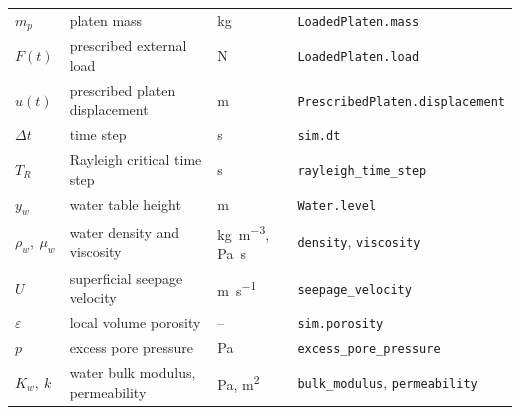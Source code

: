 \begin{table}[htbp]
\begin{tabular}{llll}
    $m_{p}$          & platen mass                      & \unit{\kilogram}     & \texttt{LoadedPlaten.mass} \\
    $F(t)$           & prescribed external load         & \unit{\newton}       & \texttt{LoadedPlaten.load} \\
    $u(t)$           & prescribed platen displacement   & \unit{\metre}        & \texttt{PrescribedPlaten.displacement} \\
    $\Delta t$       & time step                        & \unit{\second}       & \texttt{sim.dt} \\
    $T_{R}$          & Rayleigh critical time step      & \unit{\second}       & \texttt{rayleigh\_time\_step} \\
    $y_{w}$          & water table height               & \unit{\metre}        & \texttt{Water.level} \\
    $\rho_{w},\ \mu_{w}$ & water density and viscosity  & \unit{\kilogram\per\cubic\metre}, \unit{\pascal\second} & \texttt{density}, \texttt{viscosity} \\
    $U$              & superficial seepage velocity     & \unit{\metre\per\second} & \texttt{seepage\_velocity} \\
    $\varepsilon$    & local volume porosity            & --                   & \texttt{sim.porosity} \\
    $p$              & excess pore pressure             & \unit{\pascal}       & \texttt{excess\_pore\_pressure} \\
    $K_{w},\ k$      & water bulk modulus, permeability & \unit{\pascal}, \unit{\metre\squared} & \texttt{bulk\_modulus}, \texttt{permeability} \\
    \bottomrule
  \end{tabular}
\end{table}
